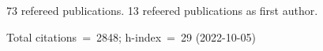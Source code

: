 73 refereed publications. 13 refeered publications as first author.

Total citations~=~2848; h-index~=~29 (2022-10-05)